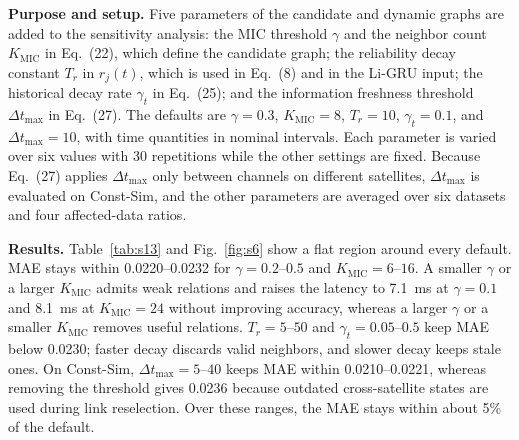 \documentclass[10pt,a4paper]{article}
\begin{document}
\textbf{Purpose and setup.} Five parameters of the candidate and dynamic graphs are added to the sensitivity analysis: the MIC threshold $\gamma$ and the neighbor count $K_{\mathrm{MIC}}$ in Eq.~(22), which define the candidate graph; the reliability decay constant $T_r$ in $r_j(t)$, which is used in Eq.~(8) and in the Li-GRU input; the historical decay rate $\gamma_t$ in Eq.~(25); and the information freshness threshold $\Delta t_{\max}$ in Eq.~(27). The defaults are $\gamma=0.3$, $K_{\mathrm{MIC}}=8$, $T_r=10$, $\gamma_t=0.1$, and $\Delta t_{\max}=10$, with time quantities in nominal intervals. Each parameter is varied over six values with 30 repetitions while the other settings are fixed. Because Eq.~(27) applies $\Delta t_{\max}$ only between channels on different satellites, $\Delta t_{\max}$ is evaluated on Const-Sim, and the other parameters are averaged over six datasets and four affected-data ratios.

\textbf{Results.} Table~\ref{tab:s13} and Fig.~\ref{fig:s6} show a flat region around every default. MAE stays within 0.0220--0.0232 for $\gamma=0.2$--$0.5$ and $K_{\mathrm{MIC}}=6$--$16$. A smaller $\gamma$ or a larger $K_{\mathrm{MIC}}$ admits weak relations and raises the latency to 7.1~ms at $\gamma=0.1$ and 8.1~ms at $K_{\mathrm{MIC}}=24$ without improving accuracy, whereas a larger $\gamma$ or a smaller $K_{\mathrm{MIC}}$ removes useful relations. $T_r=5$--$50$ and $\gamma_t=0.05$--$0.5$ keep MAE below 0.0230; faster decay discards valid neighbors, and slower decay keeps stale ones. On Const-Sim, $\Delta t_{\max}=5$--$40$ keeps MAE within 0.0210--0.0221, whereas removing the threshold gives 0.0236 because outdated cross-satellite states are used during link reselection. Over these ranges, the MAE stays within about 5\% of the default.
\end{document}
